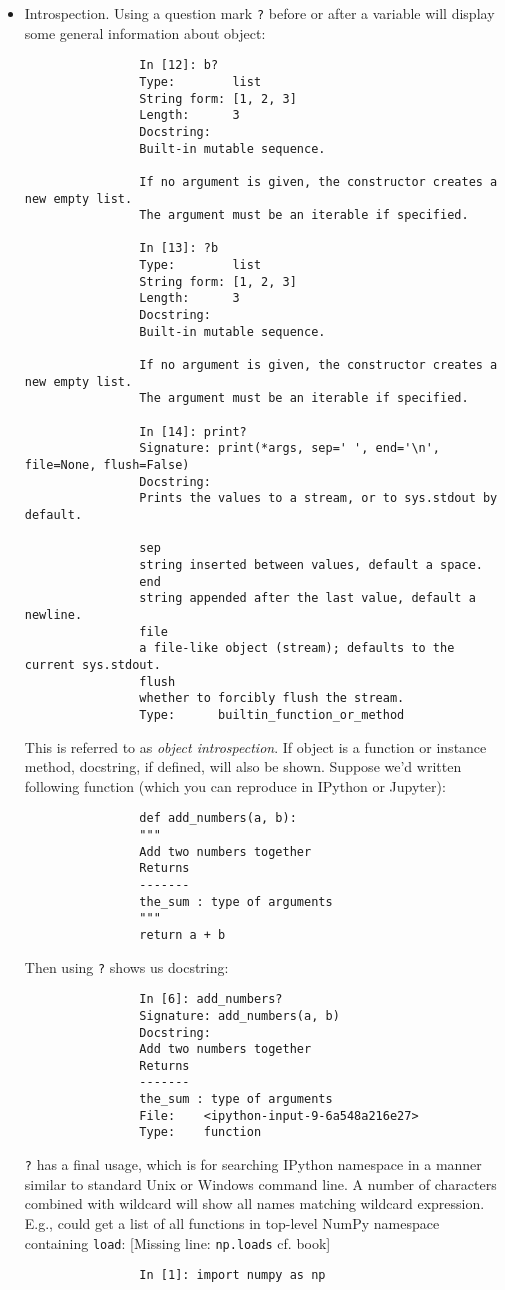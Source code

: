 \documentclass{article}
\begin{document}
\begin{itemize}
\begin{itemize}
\begin{itemize}
			Combined with \verb|%run| command, this functionality can save you many keystrokes.
			
			Another area where tab completion saves time is in completion of function keyword arguments (including $=$ sign!) {\sf Fig. 2.4: Autocomplete function keywords in a Jupyter notebook}.
			
			Have a closer look at functions in a little bit:
			\item {\sf Introspection.} Using a question mark {\tt?} before or after a variable will display some general information about object:
			\begin{verbatim}
				In [12]: b?
				Type:        list
				String form: [1, 2, 3]
				Length:      3
				Docstring:  
				Built-in mutable sequence.
				
				If no argument is given, the constructor creates a new empty list.
				The argument must be an iterable if specified.
				
				In [13]: ?b
				Type:        list
				String form: [1, 2, 3]
				Length:      3
				Docstring:  
				Built-in mutable sequence.
				
				If no argument is given, the constructor creates a new empty list.
				The argument must be an iterable if specified.
				
				In [14]: print?
				Signature: print(*args, sep=' ', end='\n', file=None, flush=False)
				Docstring:
				Prints the values to a stream, or to sys.stdout by default.
				
				sep
				string inserted between values, default a space.
				end
				string appended after the last value, default a newline.
				file
				a file-like object (stream); defaults to the current sys.stdout.
				flush
				whether to forcibly flush the stream.
				Type:      builtin_function_or_method
			\end{verbatim}
			This is referred to as {\it object introspection}. If object is a function or instance method, docstring, if defined, will also be shown. Suppose we'd written following function (which you can reproduce in IPython or Jupyter):
			\begin{verbatim}
				def add_numbers(a, b):
				"""
				Add two numbers together
				Returns
				-------
				the_sum : type of arguments
				"""
				return a + b
			\end{verbatim}
			Then using {\tt?} shows us docstring:
			\begin{verbatim}
				In [6]: add_numbers?
				Signature: add_numbers(a, b)
				Docstring:
				Add two numbers together
				Returns
				-------
				the_sum : type of arguments
				File:    <ipython-input-9-6a548a216e27>
				Type:    function
			\end{verbatim}
			{\tt?} has a final usage, which is for searching IPython namespace in a manner similar to standard Unix or Windows command line. A number of characters combined with wildcard {\tt*} will show all names matching wildcard expression. E.g., could get a list of all functions in top-level NumPy namespace containing {\tt load}: [Missing line: {\tt np.loads} cf. book]
			\begin{verbatim}
				In [1]: import numpy as np
				

\end{verbatim}
\end{itemize}
\end{itemize}
\end{itemize}
\end{document}
